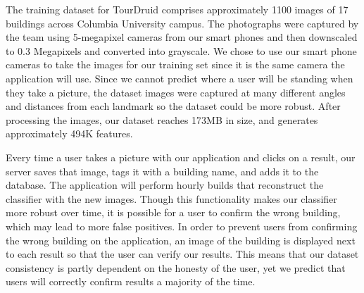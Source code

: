 The training dataset for TourDruid comprises approximately 1100 images of 17 buildings across Columbia University campus. The photographs were captured by the team using 5-megapixel cameras from our smart phones and then downscaled to 0.3 Megapixels and converted into grayscale. We chose to use our smart phone cameras to take the images for our training set since it is the same camera the application will use. Since we cannot predict where a user will be standing when they take a picture, the dataset images were captured at many different angles and distances from each landmark so the dataset could be more robust. After processing the images, our dataset reaches 173MB in size, and generates approximately 494K features.

Every time a user takes a picture with our application and clicks on a result, our server saves that image, tags it with a building name, and adds it to the database. The application will perform hourly builds that reconstruct the classifier with the new images. Though this functionality makes our classifier more robust over time, it is possible for a user to confirm the wrong building, which may lead to more false positives. In order to prevent users from confirming the wrong building on the application, an image of the building is displayed next to each result so that the user can verify our results. This means that our dataset consistency is partly dependent on the honesty of the user, yet we predict that users will correctly confirm results a majority of the time.